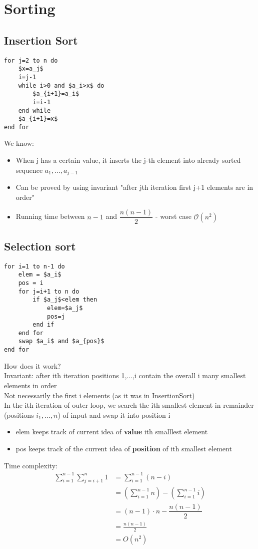 \documentclass{article}[18pt]
\begin{document}
\section{Sorting}
\subsection{Insertion Sort}
\begin{lstlisting}[caption={InsertionSort $(a_1\ldots,a_n\in \mathbb{R}, n\geqslant 2)$}]
for j=2 to n do
	$x=a_j$
	i=j-1
	while i>0 and $a_i>x$ do
		$a_{i+1}=a_i$
		i=i-1
	end while
	$a_{i+1}=x$
end for
\end{lstlisting}
We know:
\begin{itemize}
	\item When j has a certain value, it inserts the j-th element into already sorted sequence $a_1,\ldots, a_{j-1}$
	\item Can be proved  by using invariant "after jth iteration first j+1 elements are in order"
	\item Running time between $n-1$ and $\dfrac{n(n-1)}{2}$ - worst case $\mathcal{O}(n^2)$
\end{itemize}
\subsection{Selection sort}
\begin{lstlisting}[caption={SelectionSort $(a_1,...,a_n\in \mathbb{R}, n\geqslant 2)$}]
for i=1 to n-1 do
	elem = $a_i$
	pos = i
	for j=i+1 to n do
		if $a_j$<elem then
			elem=$a_j$
			pos=j
		end if
	end for
	swap $a_i$ and $a_{pos}$
end for			
\end{lstlisting}
How does it work?\\
Invariant: after ith iteration positions 1,...,i contain the overall i many smallest elements in order\\
Not necessarily the first i elements (as it was in InsertionSort)\\
In the ith iteration of outer loop, we search the ith smallest element in remainder (positions $i_1,...,n$) of input and swap it into position i
\begin{itemize}
	\item elem keeps track of current idea of \textbf{value} ith smalllest element
	\item pos keeps track of the current idea of \textbf{position} of ith smallest element
\end{itemize}
Time complexity:
\[
\begin{aligned} \sum_{i=1}^{n-1} \sum_{j=i+1}^{n} 1 &=\sum_{i=1}^{n-1}(n-i) \\ &=\left(\sum_{i=1}^{n-1} n\right)-\left(\sum_{i=1}^{n-1} i\right) \\ &= (n-1)\cdot n-\dfrac{n(n-1)}{2}\\ &=\frac{n(n-1)}{2} \\ &=O\left(n^{2}\right) \end{aligned}
\]
\end{document}
